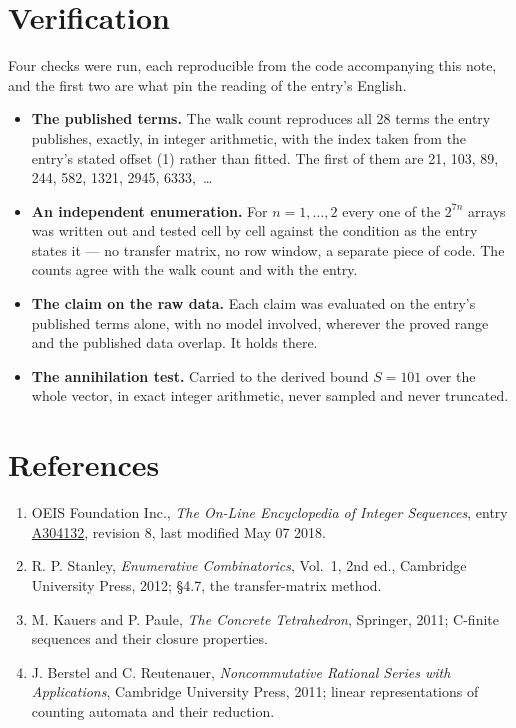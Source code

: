 \documentclass[11pt]{article}
\theoremstyle{definition}
\begin{document}
\section{Verification}

Four checks were run, each reproducible from the code accompanying this note, and the first two are what pin the reading of the entry's English.

\begin{itemize}

\item {\bfseries The published terms.} The walk count reproduces all 28 terms the entry publishes, exactly, in integer arithmetic, with the index taken from the entry's stated offset (1) rather than fitted. The first of them are 21, 103, 89, 244, 582, 1321, 2945, 6333,~\dots

\item {\bfseries An independent enumeration.} For $n = 1,\dots,2$ every one of the $2^{7n}$ arrays was written out and tested cell by cell against the condition as the entry states it --- no transfer matrix, no row window, a separate piece of code. The counts agree with the walk count and with the entry.

\item {\bfseries The claim on the raw data.} Each claim was evaluated on the entry's published terms alone, with no model involved, wherever the proved range and the published data overlap. It holds there.

\item {\bfseries The annihilation test.} Carried to the derived bound $S = 101$ over the whole vector, in exact integer arithmetic, never sampled and never truncated.

\end{itemize}

\section{References}

\begin{enumerate}

\item OEIS Foundation Inc., \emph{The On-Line Encyclopedia of Integer Sequences}, entry \href{https://oeis.org/A304132}{A304132}, revision 8, last modified May 07 2018.

\item R. P. Stanley, \emph{Enumerative Combinatorics}, Vol.~1, 2nd ed., Cambridge University Press, 2012; \S4.7, the transfer-matrix method.

\item M. Kauers and P. Paule, \emph{The Concrete Tetrahedron}, Springer, 2011; C-finite sequences and their closure properties.

\item J. Berstel and C. Reutenauer, \emph{Noncommutative Rational Series with Applications}, Cambridge University Press, 2011; linear representations of counting automata and their reduction.

\end{enumerate}
\end{document}
